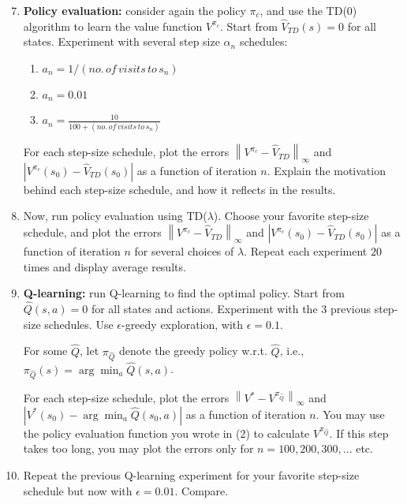 \begin{exercise}
\begin{enumerate}
\setcounter{enumi}{6}
  \item \textbf{Policy evaluation:} consider again the policy ${\pi _c}$, and use the TD(0) algorithm to learn the value function ${V^{{\pi _c}}}$. Start from ${\hat V_{TD}}(s) = 0$ for all states. Experiment with several step size ${\alpha _n}$ schedules:
      \begin{enumerate}
        \item ${a_n} = 1/\left( {no.\,of\,visits\,to\,{s_n}} \right)$
        \item ${a_n} = 0.01$
        \item ${a_n} = \frac{{10}}{{100 + \left( {no.\,of\,visits\,to\,{s_n}} \right)}}$
      \end{enumerate}
For each step-size schedule, plot the errors ${\left\| {{V^{{\pi _c}}} - {{\hat V}_{TD}}} \right\|_\infty }$ and $\left| {{V^{{\pi _c}}}({s_0}) - {{\hat V}_{TD}}({s_0})} \right|$ as a function of iteration $n$. Explain the motivation behind each step-size schedule, and how it reflects in the results.

  \item Now, run policy evaluation using TD($\lambda $). Choose your favorite step-size schedule, and plot the errors ${\left\| {{V^{{\pi _c}}} - {{\hat V}_{TD}}} \right\|_\infty }$ and $\left| {{V^{{\pi _c}}}({s_0}) - {{\hat V}_{TD}}({s_0})} \right|$ as a function of iteration $n$ for several choices of $\lambda $. Repeat each experiment $20$ times and display average results.
  \item \textbf{Q-learning:} run Q-learning to find the optimal policy. Start from $\hat Q(s,a) = 0$ for all states and actions. Experiment with the 3 previous step-size schedules. Use $\epsilon$-greedy exploration, with $\epsilon = 0.1$.
      
      For some $\hat Q$, let  ${\pi _{\hat Q}}$ denote the greedy policy w.r.t. $\hat Q$, i.e., ${\pi _{\hat Q}}(s) = \arg {\min _a}\hat Q(s,a)$.
      
For each step-size schedule, plot the errors ${\left\| {{V^*} - {V^{{\pi _{\hat Q}}}}} \right\|_\infty }$ and $\left| {{V^*}({s_0}) - \arg {{\min }_a}\hat Q({s_0},a)} \right|$ as a function of iteration $n$. You may use the policy evaluation function you wrote in (2) to calculate ${V^{{\pi _{\hat Q}}}}$. If this step takes too long, you may plot the errors only for $n = 100,200,300,...$ etc.

  \item Repeat the previous Q-learning experiment for your favorite step-size schedule but now with $\epsilon = 0.01$. Compare.
\end{enumerate}
\end{exercise}

